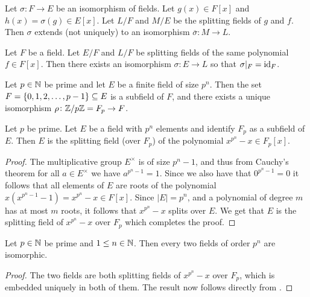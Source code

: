 \documentclass[11pt,a4paper]{article}
\begin{document}
\begin{exercise}
  Let $\sigma \colon F \to E$ be an isomorphism of fields.
  Let $g(x) \in F[x]$ and $h(x) = \sigma(g) \in E[x]$.
  Let $L/F$ and $M/E$ be the splitting fields of $g$ and $f$.
  Then $\sigma$ extends (not uniquely) to an isomorphism
  $\overline \sigma \colon M \to L$.
\end{exercise}

\begin{corollary}
  \label{cor:splitting-fields-isomorphism}
  Let $F$ be a field.
  Let $E/F$ and $L/F$ be splitting fields
  of the same polynomial $f \in F[x]$.
  Then there exists an isomorphism $\sigma \colon E \to L$
  so that $\sigma\vert_F = \operatorname{id}_F$.
\end{corollary}

\begin{remark}
  Let $p \in \mathbb{N}$ be prime and let $E$ be a finite field of size $p^n$.
  Then the set $F = \left\{0,1,2,\dots,p-1\right\} \subseteq E$ is a subfield
  of $F$, and there exists a unique isomorphism
  $\rho \colon \mathbb{Z}/p\mathbb{Z} = F_{p} \to F$.
\end{remark}

\begin{lemma}
  Let $p$ be prime.
  Let $E$ be a field with $p^n$ elements and identify $F_p$ as
  a subfield of $E$.
  Then $E$ is the splitting field (over $F_p$) of the polynomial
  $x^{p^n} - x \in F_p[x]$.
\end{lemma}
\begin{proof}
  The multiplicative group $E^{\times}$ is of size $p^n - 1$,
  and thus from Cauchy's theorem for all $a \in E^{\times}$ we have
  $a^{p^n-1} = 1$.
  Since we also have that $0^{p^n-1} = 0$ it follows that all elements
  of $E$ are roots of the polynomial $x(x^{p^n-1} - 1) = x^{p^n} - x \in F[x]$.
  Since $|E| = p^n$, and a polynomial of degree $m$ has at most
  $m$ roots, it follows that $x^{p^n} - x$ splits over $E$.
  We get that $E$ is the splitting field
  of $x^{p^n} - x$ over $F_p$ which completes the proof.
\end{proof}

\begin{corollary}
  Let $p \in \mathbb{N}$ be prime and $1 \le n \in \mathbb{N}$.
  Then every two fields of order $p^n$ are isomorphic.
\end{corollary}
\begin{proof}
  The two fields are both splitting fields of $x^{p^n} - x$ over $F_p$,
  which is embedded uniquely in both of them.
  The result now follows directly from .
\end{proof}
\end{document}
